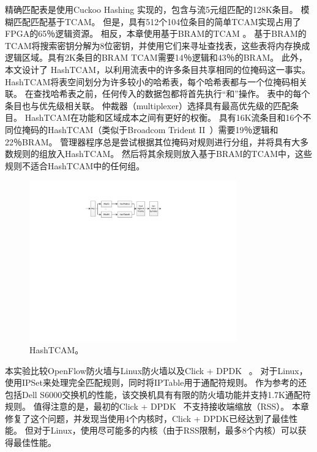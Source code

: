精确匹配表是使用Cuckoo Hashing \cite{cuckoo} 实现的，包含与流5元组匹配的128K条目。
模糊匹配匹配基于TCAM。
但是，具有512个104位条目的简单TCAM实现占用了FPGA的65％逻辑资源。
相反，本章使用基于BRAM的TCAM \cite {jiang2013scalable}。
基于BRAM的TCAM将搜索密钥分解为8位密钥，并使用它们来寻址查找表，这些表将内存换成逻辑区域。具有2K条目的BRAM TCAM需要14％逻辑和43％的BRAM。
此外，本文设计了 HashTCAM，以利用流表中的许多条目共享相同的位掩码这一事实。
HashTCAM将表空间划分为许多较小的哈希表，每个哈希表都与一个位掩码相关联。
在查找哈希表之前，任何传入的数据包都将首先执行“和”操作。
表中的每个条目也与优先级相关联。
仲裁器（multiplexer）选择具有最高优先级的匹配条目。
HashTCAM在功能和区域成本之间有更好的权衡。
具有16K流条目和16个不同位掩码的HashTCAM（类似于Broadcom Trident II~\cite {broadcomethernet}）需要19％逻辑和22％BRAM。
管理器程序总是尝试根据其位掩码对规则进行分组，并将具有大多数规则的组放入HashTCAM。
然后将其余规则放入基于BRAM的TCAM中，这些规则不适合HashTCAM中的任何组。



\begin{figure}[htbp]
	\centering
	\includegraphics[width=0.8\textwidth]{image/HashTCAM}
	\caption{HashTCAM。}
	\label{clicknp:fig:hashtcam}
\end{figure}



本实验比较OpenFlow防火墙与Linux防火墙以及Click + DPDK~ \cite {barbette2015fast}。
对于Linux，使用IPSet来处理完全匹配规则，同时将IPTable用于通配符规则。
作为参考的还包括Dell S6000交换机的性能，该交换机具有有限的防火墙功能并支持1.7K通配符规则。
值得注意的是，最初的Click + DPDK~ \cite {barbette2015fast}不支持接收端缩放（RSS）。
本章修复了这个问题，并发现当使用4个内核时，Click + DPDK已经达到了最佳性能。
但对于Linux，使用尽可能多的内核（由于RSS限制，最多8个内核）可以获得最佳性能。

